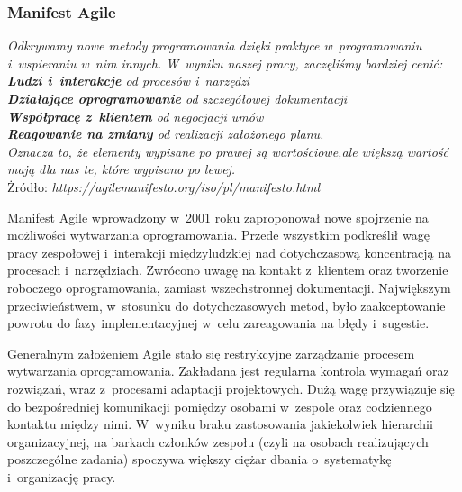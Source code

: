 \documentclass[oneside,polski,logo]{amuthesis}
\begin{document}
\subsubsection{Manifest Agile}
\begin{center}
\textit{Odkrywamy nowe metody programowania dzięki praktyce w~programowaniu i~wspieraniu w~nim innych. W~wyniku naszej pracy, zaczęliśmy bardziej cenić:\\}
\hfill \break
\textit{\textbf{Ludzi i~interakcje} od procesów i~narzędzi\\}
\textit{\textbf{Działające oprogramowanie} od szczegółowej dokumentacji\\}
\textit{\textbf{Współpracę z~klientem} od negocjacji umów\\}
\textit{\textbf{Reagowanie na zmiany} od realizacji założonego planu.\\}
\textit{Oznacza to, że elementy wypisane po prawej są wartościowe,ale większą wartość mają dla nas te, które wypisano po lewej. \\}
\hfill \break
Żródło: \textit{https://agilemanifesto.org/iso/pl/manifesto.html}
\end{center}

Manifest Agile wprowadzony w~2001 roku zaproponował nowe spojrzenie na możliwości wytwarzania oprogramowania. Przede wszystkim podkreślił wagę pracy zespołowej i~interakcji międzyludzkiej nad dotychczasową koncentracją na procesach i~narzędziach. Zwrócono uwagę na kontakt z~klientem oraz tworzenie roboczego oprogramowania, zamiast wszechstronnej dokumentacji. Największym przeciwieństwem, w~stosunku do dotychczasowych metod, było zaakceptowanie powrotu do fazy implementacyjnej w~celu zareagowania na błędy i~sugestie. \cite{agile} \cite{agile2}

Generalnym założeniem Agile stało się restrykcyjne zarządzanie procesem wytwarzania oprogramowania. Zakładana jest regularna kontrola wymagań oraz rozwiązań, wraz z~procesami adaptacji projektowych. Dużą wagę przywiązuje się do bezpośredniej komunikacji pomiędzy osobami w~zespole oraz codziennego kontaktu między nimi. W~wyniku braku zastosowania jakiekolwiek hierarchii organizacyjnej, na barkach członków zespołu (czyli na osobach realizujących poszczególne zadania) spoczywa większy ciężar dbania o~systematykę i~organizację pracy.
\end{document}
